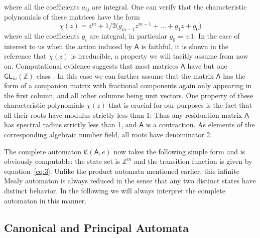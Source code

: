 \documentclass[12pt]{svmult}
\def\Z{\mathbb{Z}}
\def\AA{\mathsf{A}}             %
\def\GL#1{\mathsf{GL}_{#1}(\Z)}
\def\cmpaut{\fC}                %
\def\fC{\mathfrak{C}}           %
\begin{document}
%
where all the coefficients $a_{ij}$ are integral. 
One can verify that the characteristic polynomials of these matrices have the form 
%
\begin{equation} \label{eq:chi}
  \chi(z) = z^{m} + 1/2\bigl( g_{m-1}z^{m-1} + \ldots + g_{1}z + g_{0} \bigr) 
\end{equation}
%
where all the coefficients $g_i$ are integral; in particular $g_0 = \pm1$.
In the case of interest to us when the action induced by $\AA$ is faithful, it is shown in the 
reference that $\chi(z)$ is irreducible, a property we will tacitly assume from now on. 
Computational evidence suggests that most matrices $\AA$ have but one $\GL{m}$
class  \cite{Okano15:thesis,NekrashevychSidki04:automorphisms}.
In this case we can further assume that the matrix $\AA$ has the form of a companion 
matrix with fractional components again only appearing in the first column, and 
all other columns being unit vectors. 
One property of these characteristic polynomials $\chi(z)$ that is crucial for our purposes 
is the fact that all their roots have modulus strictly less than 1. 
Thus any residuation matrix $\AA$ has spectral radius strictly less than 1, and $\AA$ 
is a contraction. 
As elements of the corresponding algebraic number field, all roots have denominator 2. 

The complete automaton $\cmpaut(\AA,e)$ now takes the following simple form 
and is obviously computable:
the state set is $\Z^m$ and the transition function is given by equation~\eqref{eq:3}.
Unlike the product automata mentioned earlier, this infinite Mealy automaton is always reduced
in the sense that any two distinct states have distinct behavior. 
In the following we will always interpret the complete automaton in this manner. 


\subsection{Canonical and Principal Automata}
\label{sec:canonical-automata}
\end{document}
